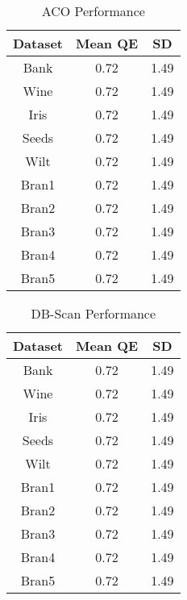 \documentclass[conference]{IEEEtran}
\begin{document}
  \begin{table}[h]
  \caption{ACO Performance}
  \resizebox{1.3\textwidth}{!} {\begin{minipage}{\textwidth}
      
      \begin{tabular}{ c |c | c }
        Dataset & Mean QE & SD \\ \hline
        Bank & 0.72 & 1.49 \\
        Wine & 0.72 & 1.49 \\
        Iris & 0.72 & 1.49 \\
        Seeds & 0.72 & 1.49 \\
        Wilt & 0.72 & 1.49 \\
        Bran1 & 0.72 & 1.49 \\
        Bran2 & 0.72 & 1.49 \\
        Bran3 & 0.72 & 1.49 \\
        Bran4 & 0.72 & 1.49 \\
        Bran5 & 0.72 & 1.49
      \end{tabular}

      \label{table:acoError}
  \end{minipage} }
  \end{table}
  
  \begin{table}[h]
  \caption{DB-Scan Performance}
  \resizebox{1.3\textwidth}{!} {\begin{minipage}{\textwidth}
      
      \begin{tabular}{ c |c | c }
        Dataset & Mean QE & SD \\ \hline
        Bank & 0.72 & 1.49 \\
        Wine & 0.72 & 1.49 \\
        Iris & 0.72 & 1.49 \\
        Seeds & 0.72 & 1.49 \\
        Wilt & 0.72 & 1.49 \\
        Bran1 & 0.72 & 1.49 \\
        Bran2 & 0.72 & 1.49 \\
        Bran3 & 0.72 & 1.49 \\
        Bran4 & 0.72 & 1.49 \\
        Bran5 & 0.72 & 1.49
      \end{tabular}

      \label{table:dbError}
  \end{minipage} }
  \end{table}
  
\end{document}
